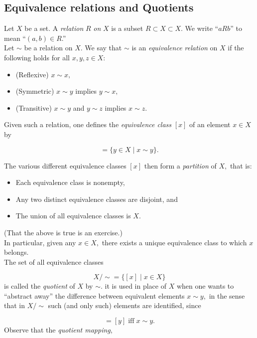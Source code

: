 \subsection{Equivalence relations and Quotients} \label{equivrel}
Let $X$ be a set. A \emph{relation} $R$ \emph{on} $X$ is a subset $R \subset X \subset X.$ We write ``$aRb$'' to mean ``$(a, b) \in R$.''\\
Let $\sim$ be a relation on $X.$ We say that $\sim$ is an \emph{equivalence relation} on $X$ if the following holds for all $x, y, z \in X:$
\begin{itemize}
	\item (Reflexive) $x \sim x,$
	\item (Symmetric) $x \sim y$ implies $y \sim x,$
	\item (Transitive) $x \sim y$ and $y \sim z$ implies $x \sim z.$
\end{itemize}
Given such a relation, one defines the \emph{equivalence class} $[x]$ of an element $x \in X$ by

\begin{equation*} 
	[x] = \{y \in  X \mid x \sim y\}.
\end{equation*}

The various different equivalence classes $[x]$ then form a \emph{partition} of $X,$ that is:
\begin{itemize}
	\item Each equivalence class is nonempty,
	\item Any two distinct equivalence classes are disjoint, and
	\item The union of all equivalence classes is $X.$
\end{itemize}
(That the above is true is an exercise.)\\
In particular, given any $x \in X,$ there exists a unique equivalence class to which $x$ belongs.\\
The set of all equivalence classes

\begin{equation*} 
	X/\sim = \{[x] \mid x \in X\}
\end{equation*}
is called the \emph{quotient} of $X$ by $\sim.$ it is used in place of $X$ when one wants to ``abstract away'' the difference between equivalent elements $x \sim y,$ in the sense that in $X/\sim$ such (and only such) elements are identified, since

\begin{equation*} 
	[x] = [y] \; \text{iff} \; x \sim y.
\end{equation*}
Observe that the \emph{quotient mapping},

